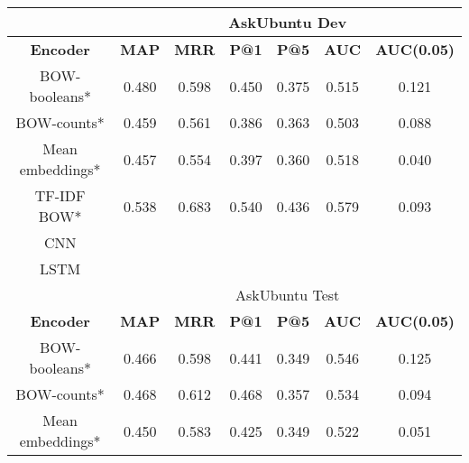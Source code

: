 \documentclass[12pt]{article}
\begin{document}
\begin{center}
		\begin{tabular}{|c||c|c|c|c||c|c|}
			\hline
			\cellcolor{gray!15}
				& \multicolumn{6}{c|}{\cellcolor{gray!15}AskUbuntu Dev} \\ \hline
			\cellcolor{gray!15}\textbf{Encoder} & \cellcolor{gray!15}\textbf{MAP} & \cellcolor{gray!15}\textbf{MRR}
				& \cellcolor{gray!15}\textbf{P@1} & \cellcolor{gray!15}\textbf{P@5}
				& \cellcolor{gray!15}\textbf{AUC} & \cellcolor{gray!15}\textbf{AUC(0.05)} \\ \hline\hline
			\cellcolor{red!15}BOW-booleans* & 0.480 & 0.598 & 0.450 & 0.375 & 0.515 & 0.121 \\ \hline
			\cellcolor{red!15}BOW-counts* & 0.459 & 0.561 & 0.386 & 0.363 & 0.503 & 0.088 \\ \hline
			\cellcolor{red!15}Mean embeddings* & 0.457 & 0.554 & 0.397 & 0.360 & 0.518 & 0.040 \\ \hline
			\cellcolor{red!15}TF-IDF BOW* & 0.538 & 0.683 & 0.540 & 0.436 & 0.579 & 0.093 \\ \hline\hline
			\cellcolor{green!15}CNN &  &  &  &  &  &  \\ \hline
			\cellcolor{green!15}LSTM &  &  &  &  &  &  \\ \hline
			\hline
			\cellcolor{gray!15}
				& \multicolumn{6}{c|}{\cellcolor{gray!15}AskUbuntu Test} \\ \hline
			\cellcolor{gray!15}\textbf{Encoder} & \cellcolor{gray!15}\textbf{MAP} & \cellcolor{gray!15}\textbf{MRR}
				& \cellcolor{gray!15}\textbf{P@1} & \cellcolor{gray!15}\textbf{P@5}
				& \cellcolor{gray!15}\textbf{AUC} & \cellcolor{gray!15}\textbf{AUC(0.05)} \\ \hline\hline
			\cellcolor{red!15}BOW-booleans* & 0.466 & 0.598 & 0.441 & 0.349 & 0.546 & 0.125 \\ \hline
			\cellcolor{red!15}BOW-counts* & 0.468 & 0.612 & 0.468 & 0.357 & 0.534 & 0.094 \\ \hline
			\cellcolor{red!15}Mean embeddings* & 0.450 & 0.583 & 0.425 & 0.349 & 0.522 & 0.051 \\ \hline

\end{tabular}
\end{center}
\end{document}
